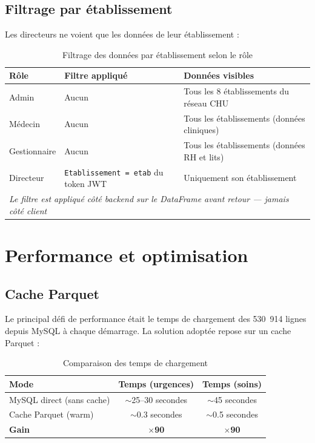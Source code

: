 \documentclass[12pt,a4paper]{report}
\begin{document}
	\subsection{Filtrage par établissement}
	
	Les directeurs ne voient que les données de leur établissement :
	
	\begin{table}[H]
		\centering
		\caption{Filtrage des données par établissement selon le rôle}
		\renewcommand{\arraystretch}{1.3}
		\begin{tabularx}{\textwidth}{llX}
			\toprule
			\textbf{Rôle} & \textbf{Filtre appliqué} & \textbf{Données visibles} \\
			\midrule
			Admin          & Aucun              & Tous les 8 établissements du réseau CHU \\
			Médecin        & Aucun              & Tous les établissements (données cliniques) \\
			Gestionnaire   & Aucun              & Tous les établissements (données RH et lits) \\
			Directeur      & \texttt{Etablissement = etab} du token JWT & Uniquement son établissement \\
			\midrule
			\multicolumn{3}{l}{\textit{Le filtre est appliqué côté backend sur le DataFrame avant retour — jamais côté client}} \\
			\bottomrule
		\end{tabularx}
	\end{table}
	
	\section{Performance et optimisation}
	
	\subsection{Cache Parquet}
	
	Le principal défi de performance était le temps de chargement des 530~914 lignes
	depuis MySQL à chaque démarrage. La solution adoptée repose sur un cache Parquet :
	
	\begin{table}[H]
		\centering
		\caption{Comparaison des temps de chargement}
		\begin{tabular}{lcc}
			\toprule
			\textbf{Mode} & \textbf{Temps (urgences)} & \textbf{Temps (soins)} \\
			\midrule
			MySQL direct (sans cache) & $\sim$25--30 secondes & $\sim$45 secondes \\
			Cache Parquet (warm)      & $\sim$0.3 secondes    & $\sim$0.5 secondes \\
			\midrule
			\textbf{Gain}             & \textbf{$\times$90}  & \textbf{$\times$90} \\
			\bottomrule
		\end{tabular}
	\end{table}
	
\end{document}
